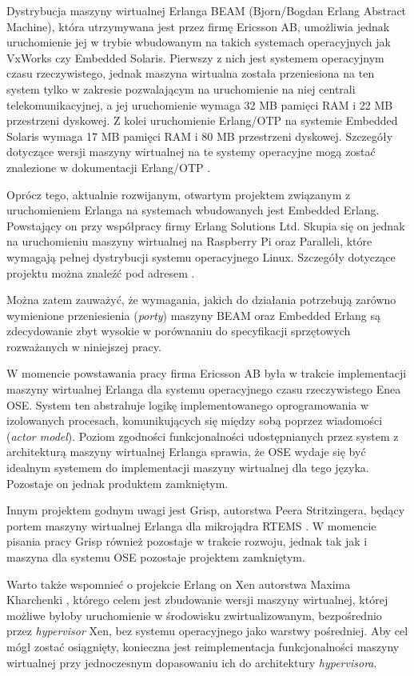 Dystrybucja maszyny wirtualnej Erlanga BEAM (Bjorn/Bogdan Erlang Abstract Machine), która utrzymywana jest przez firmę Ericsson AB, umożliwia jednak uruchomienie jej w trybie wbudowanym na takich systemach operacyjnych jak VxWorks czy Embedded Solaris. Pierwszy z nich jest systemem operacyjnym czasu rzeczywistego, jednak maszyna wirtualna została przeniesiona na ten system tylko w zakresie pozwalającym na uruchomienie na niej centrali telekomunikacyjnej, a jej uruchomienie wymaga 32 MB pamięci RAM i 22 MB przestrzeni dyskowej.
Z kolei uruchomienie Erlang/OTP na systemie Embedded Solaris wymaga 17 MB pamięci RAM i 80 MB przestrzeni dyskowej.
Szczegóły dotyczące wersji maszyny wirtualnej na te systemy operacyjne mogą zostać znalezione w dokumentacji Erlang/OTP \cite{ErlangVxWorks}.


Oprócz tego, aktualnie rozwijanym, otwartym projektem związanym z uruchomieniem Erlanga na systemach wbudowanych jest Embedded Erlang. Powstający on przy współpracy firmy Erlang Solutions Ltd. Skupia się on jednak na uruchomieniu maszyny wirtualnej na Raspberry Pi oraz Paralleli, które wymagają pełnej dystrybucji systemu operacyjnego Linux. Szczegóły dotyczące projektu można znaleźć pod adresem \cite{ErlangEmbedded}.


Można zatem zauważyć, że wymagania, jakich do działania potrzebują zarówno wymienione przeniesienia (\emph{porty}) maszyny BEAM oraz Embedded Erlang są zdecydowanie zbyt wysokie w porównaniu do specyfikacji sprzętowych rozważanych w niniejszej pracy.


W momencie powstawania pracy firma Ericsson AB była w trakcie implementacji maszyny wirtualnej Erlanga dla systemu operacyjnego czasu rzeczywistego Enea OSE. System ten abstrahuje logikę implementowanego oprogramowania w izolowanych procesach, komunikujących się między sobą poprzez wiadomości (\emph{actor model}). Poziom zgodności funkcjonalności udostępnianych przez system z architekturą maszyny wirtualnej Erlanga sprawia, że OSE wydaje się być idealnym systemem do implementacji maszyny wirtualnej dla tego języka. Pozostaje on jednak produktem zamkniętym.

Innym projektem godnym uwagi jest Grisp, autorstwa Peera Stritzingera, będący portem maszyny wirtualnej Erlanga dla mikrojądra RTEMS \cite{Stritzinger2013}. W momencie pisania pracy Grisp również pozostaje w trakcie rozwoju, jednak tak jak i maszyna dla systemu OSE pozostaje projektem zamkniętym.

Warto także wspomnieć o projekcie Erlang on Xen autorstwa Maxima Kharchenki \cite{Kharchenko2012}, którego celem jest zbudowanie wersji maszyny wirtualnej, której możliwe byłoby uruchomienie w środowisku zwirtualizowanym, bezpośrednio przez \emph{hypervisor} Xen, bez systemu operacyjnego jako warstwy pośredniej. Aby cel mógł zostać osiągnięty, konieczna jest reimplementacja funkcjonalności maszyny wirtualnej przy jednoczesnym dopasowaniu ich do architektury \emph{hypervisora}.

